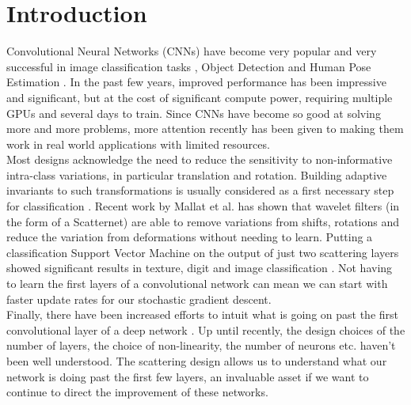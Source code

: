 \documentclass[12pt, a4paper, oneside, english]{article}
\begin{document}
\section{Introduction}
Convolutional Neural Networks (CNNs) have become very popular and very successful in image classification tasks \cite{krizhevsky_imagenet_2012}, Object Detection \cite{ren_object_2015} and Human Pose Estimation \cite{tompson_efficient_2015}. In the past few years, improved performance has been impressive and significant, but at the cost of significant compute power, requiring multiple GPUs and several days to train. Since CNNs have become so good at solving more and more problems, more attention recently has been given to making them work in real world applications with limited resources. \\
Most designs acknowledge the need to reduce the sensitivity to non-informative intra-class variations, in particular translation and rotation. Building adaptive invariants to such transformations is usually considered as a first necessary step for classification \cite{poggio_computational_2012}. Recent work by Mallat et al. \cite{sifre_rotation_2013, sifre_rigid-motion_2014} has shown that wavelet filters (in the form of a Scatternet) are able to remove variations from shifts, rotations and reduce the variation from deformations without needing to learn. Putting a classification Support Vector Machine on the output of just two scattering layers showed significant results in texture, digit and image classification \cite{bruna_invariant_2013, oyallon_generic_2013}. Not having to learn the first layers of a convolutional network can mean we can start with faster update rates for our stochastic gradient descent.\\
Finally, there have been increased efforts to intuit what is going on past the first convolutional layer of a deep network \cite{simonyan_deep_2014, mahendran_understanding_2015, zeiler_visualizing_compact_2014}. Up until recently, the design choices of the number of layers, the choice of non-linearity, the number of neurons etc. haven't been well understood. The scattering design allows us to understand what our network is doing past the first few layers, an invaluable asset if we want to continue to direct the improvement of these networks.
\end{document}

